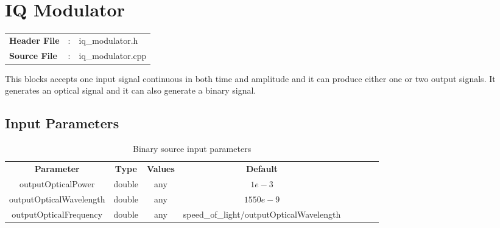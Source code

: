 \clearpage

\section{IQ Modulator}

\begin{tcolorbox}	
	\begin{tabular}{p{2.75cm} p{0.2cm} p{10.5cm}} 	
		\textbf{Header File}   &:& iq\_modulator.h \\
		\textbf{Source File}   &:& iq\_modulator.cpp \\
	\end{tabular}
\end{tcolorbox}

This blocks accepts one input signal continuous in both time and amplitude and it can produce either one or two output signals. It generates an optical signal and it can also generate a binary signal.

\subsection*{Input Parameters}

\begin{table}[h]
	\centering
	\begin{tabular}{|c|c|c|c|cccc}
		\cline{1-4}
		\textbf{Parameter} & \textbf{Type} & \textbf{Values} &   \textbf{Default}& \\ \cline{1-4}
		outputOpticalPower & double & any & $1e-3$ \\ \cline{1-4}
		outputOpticalWavelength & double & any & $1550e-9$ \\ \cline{1-4}
		outputOpticalFrequency & double & any & speed\_of\_light/outputOpticalWavelength \\ \cline{1-4}
	\end{tabular}
	\caption{Binary source input parameters}
	\label{table:iqmod_in_par}
\end{table}


